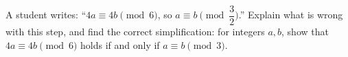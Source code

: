 A student writes: ``$4a\equiv4b\pmod6$, so $a\equiv b\pmod{\dfrac32}$.'' Explain what is wrong with this step, and find the correct simplification: for integers $a,b$, show that $4a\equiv4b\pmod6$ holds if and only if $a\equiv b\pmod3$.
